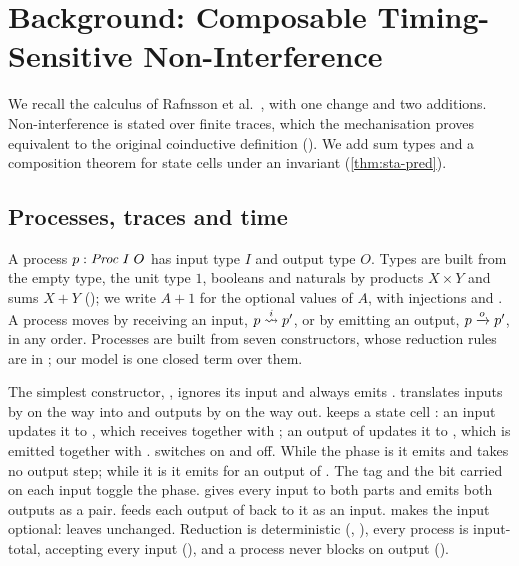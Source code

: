 \section{Background: Composable Timing-Sensitive Non-Interference}\label{sec:background}

We recall the calculus of Rafnsson et al.~\cite{rafnsson2017}, with one change and
two additions. Non-interference is stated over finite traces, which the mechanisation
proves equivalent to the original coinductive definition (\appx). We add sum types and
a composition theorem for state cells under an invariant (\cref{thm:sta-pred}).

\subsection{Processes, traces and time}

A process $p : \mathit{Proc}\;I\;O$ has input type $I$ and output type $O$. Types are
built from the empty type, the unit type $1$, booleans and naturals by
products $X \times Y$ and sums $X + Y$ (); we write $A + 1$ for the optional
values of $A$, with injections  and . A process moves by
receiving an input, $p \overset{i}{\rightsquigarrow} p'$, or by emitting an output,
$p \xrightarrow{o} p'$, in any order. Processes are built from seven constructors, whose
reduction rules are in \appx; our model is one closed term over them.

The simplest constructor, , ignores its input and always emits .  translates
inputs by  on the way into  and outputs by  on the way out.
 keeps a state cell : an input  updates it to
, which  receives together with ; an output  of
 updates it to , which is emitted together with .
 switches  on and off. While the phase  is
 it emits  and  takes no output step; while it is
 it emits  for an output  of . The tag
 and the bit carried on each input toggle the phase.  gives every input to
both parts and emits both outputs as a pair.  feeds each output of
 back to it as an input.  makes the input optional: 
leaves  unchanged. Reduction is deterministic
(, ), every process is input-total, accepting every input (), and a
process never blocks on output ().

